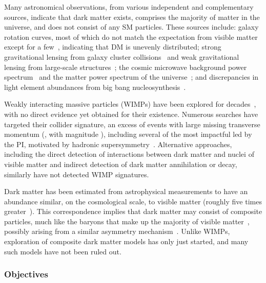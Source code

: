 Many astronomical observations, from various independent and complementary sources,
indicate that dark matter exists, comprises the majority of matter in the universe, and does not consist of any SM particles.
These sources include:
galaxy rotation curves, most of which do not match the expectation from visible matter~\cite{Rubin:1980zd,Persic:1995ru} except for a few~\cite{vanDokkum:2018vup,PinaMancera:2021wpc}, indicating that DM is unevenly distributed;
strong gravitational lensing from galaxy cluster collisions~\cite{Clowe:2006eq} and weak gravitational lensing from large-scale structures~\cite{Chang:2017kmv};
the cosmic microwave background power spectrum~\cite{Planck:2018vyg} and the matter power spectrum of the universe~\cite{Dodelson:2011qv,Planck:2018nkj};
and discrepancies in light element abundances from big bang nucleosynthesis~\cite{Pospelov:2010hj}.

Weakly interacting massive particles (WIMPs) have been explored for decades~\cite{Jungman:1995df}, with no direct evidence yet obtained for their existence.
Numerous searches have targeted their collider signature, an excess of events with large missing transverse momentum (\ptvecmiss, with magnitude \met),
including several of the most impactful led by the PI, motivated by hadronic supersymmetry~\cite{Khachatryan:2016kdk,Sirunyan:2017cwe,Sirunyan:2019hzr,Sirunyan:2019ctn,CMS:2023xlp}.
Alternative approaches, including the direct detection of interactions between dark matter and nuclei of visible matter
and indirect detection of dark matter annihilation or decay, similarly have not detected WIMP signatures.

Dark matter has been estimated from astrophysical measurements to have an abundance similar,
on the cosmological scale, to visible matter (roughly five times greater~\cite{Ade:2015xua}).
This correspondence implies that dark matter may consist of composite particles, much like the baryons that make up the majority of visible matter~\cite{Bai:2013xga},
possibly arising from a similar asymmetry mechanism~\cite{Petraki:2013wwa}.
Unlike WIMPs, exploration of composite dark matter models has only just started, and many such models have not been ruled out.

\subsubsection{Objectives}\label{subsec:dmobj}


